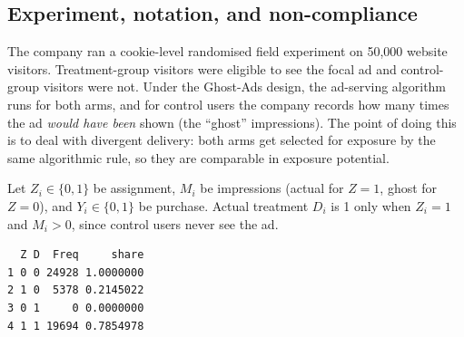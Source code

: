\subsection{Experiment, notation, and non-compliance}

The company ran a cookie-level randomised field experiment on 50,000
website visitors. Treatment-group visitors were eligible to see the
focal ad and control-group visitors were not. Under the Ghost-Ads
design, the ad-serving algorithm runs for both arms, and for control
users the company records how many times the ad \emph{would have been}
shown (the ``ghost'' impressions). The point of doing this is to deal
with divergent delivery: both arms get selected for exposure by the same
algorithmic rule, so they are comparable in exposure potential.

Let \(Z_i \in \{0,1\}\) be assignment, \(M_i\) be impressions (actual
for \(Z=1\), ghost for \(Z=0\)), and \(Y_i \in \{0,1\}\) be purchase.
Actual treatment \(D_i\) is 1 only when \(Z_i = 1\) and \(M_i > 0\),
since control users never see the ad.

\begin{Shaded}
\begin{Highlighting}[]
\OtherTok{\textless{}{-}} \NormalTok{(}
  \NormalTok{(}\SpecialCharTok{$}\SpecialCharTok{$}
\NormalTok{)}
\SpecialCharTok{$}\OtherTok{\textless{}{-}} 
\SpecialCharTok{/} 
\end{Highlighting}
\end{Shaded}

\begin{verbatim}
  Z D  Freq     share
1 0 0 24928 1.0000000
2 1 0  5378 0.2145022
3 0 1     0 0.0000000
4 1 1 19694 0.7854978
\end{verbatim}

